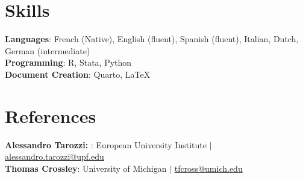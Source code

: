 \documentclass[11pt]{article}
\begin{document}
\section{Skills}
 \begin{itemize}[leftmargin=0.5cm, label={}]
    \small{\item{
     \textbf{Languages}{: French (Native), English (fluent), Spanish (fluent), Italian, Dutch, German (intermediate)} \\
     \textbf{Programming}{: R, Stata, Python} \\
     \textbf{Document Creation}{: Quarto, LaTeX} 
    }}
 \end{itemize}
    

\section{References}
 \begin{itemize}[leftmargin=0.5cm, label={}]
    \small{\item{
     \textbf{Alessandro Tarozzi: }{: European University Institute  $|$ \href{mailto:alessandro.tarozzi@upf.edu}{alessandro.tarozzi@upf.edu}} \\
     \textbf{Thomas Crossley}{:  University of Michigan $|$ \href{mailto:tfcross@umich.edu}{tfcross@umich.edu}} 
    }}
 \end{itemize} 
    
  
\end{document}
